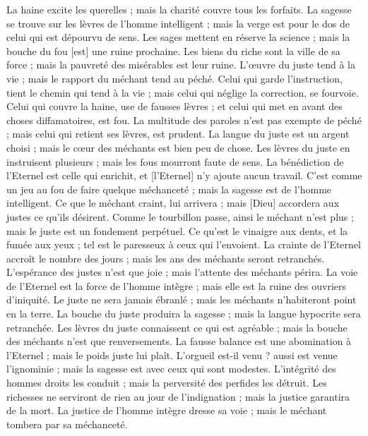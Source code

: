 \begin{multicols}{2}
La haine excite les querelles ; mais la charité couvre tous les forfaits.
La sagesse se trouve sur les lèvres de l'homme intelligent ; mais la verge est pour le dos de celui qui est dépourvu de sens.
Les sages mettent en réserve la science ; mais la bouche du fou [est] une ruine prochaine.
Les biens du riche sont la ville de sa force ; mais la pauvreté des misérables est leur ruine.
L'œuvre du juste tend à la vie ; mais le rapport du méchant tend au péché.
Celui qui garde l'instruction, tient le chemin qui tend à la vie ; mais celui qui néglige la correction, se fourvoie.
Celui qui couvre la haine, use de fausses lèvres ; et celui qui met en avant des choses diffamatoires, est fou.
La multitude des paroles n'est pas exempte de péché ; mais celui qui retient ses lèvres, est prudent.
La langue du juste est un argent choisi ; mais le cœur des méchants est bien peu de chose.
Les lèvres du juste en instruisent plusieurs ; mais les fous mourront faute de sens.
La bénédiction de l'Eternel est celle qui enrichit, et [l'Eternel] n'y ajoute aucun travail.
C'est comme un jeu au fou de faire quelque méchanceté ; mais la sagesse est de l'homme intelligent.
Ce que le méchant craint, lui arrivera ; mais [Dieu] accordera aux justes ce qu'ils désirent.
Comme le tourbillon passe, ainsi le méchant n'est plus ; mais le juste est un fondement perpétuel.
Ce qu'est le vinaigre aux dents, et la fumée aux yeux ; tel est le paresseux à ceux qui l'envoient.
La crainte de l'Eternel accroît le nombre des jours ; mais les ans des méchants seront retranchés.
L'espérance des justes n'est que joie ; mais l'attente des méchants périra.
La voie de l'Eternel est la force de l'homme intègre ; mais elle est la ruine des ouvriers d'iniquité.
Le juste ne sera jamais ébranlé ; mais les méchants n'habiteront point en la terre.
La bouche du juste produira la sagesse ; mais la langue hypocrite sera retranchée.
Les lèvres du juste connaissent ce qui est agréable ; mais la bouche des méchants n'est que renversements.
\VerseOne{}La fausse balance est une abomination à l'Eternel ; mais le poids juste lui plaît.
L'orgueil est-il venu ? aussi est venue l'ignominie ; mais la sagesse est avec ceux qui sont modestes.
L'intégrité des hommes droits les conduit ; mais la perversité des perfides les détruit.
Les richesses ne serviront de rien au jour de l'indignation ; mais la justice garantira de la mort.
La justice de l'homme intègre dresse sa voie ; mais le méchant tombera par sa méchanceté.

\end{multicols}
